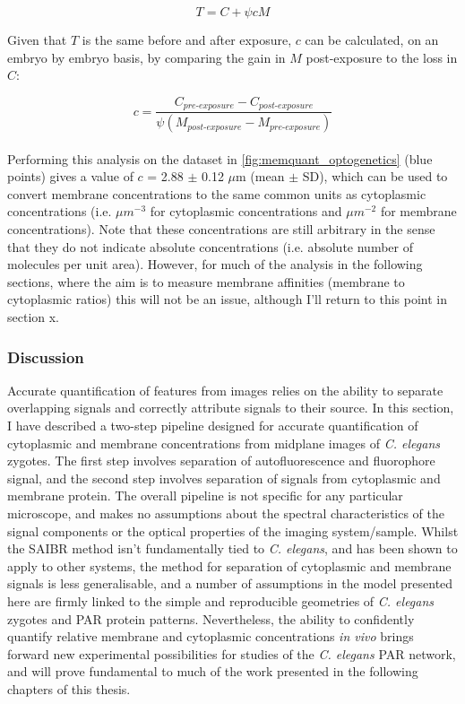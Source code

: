 \documentclass[12pt]{"article"}
\begin{document}
\begin{equation}
T = C + \psi c M
\label{eq:t}
\end{equation}

Given that $T$ is the same before and after exposure, $c$ can be calculated, on an embryo by embryo basis, by comparing the gain in $M$ post-exposure to the loss in $C$:

\begin{equation}
c = \frac{C_{pre \textrm{-} exposure} - C_{post  \textrm{-} exposure}}{\psi (M_{post  \textrm{-} exposure} - M_{pre  \textrm{-} exposure})}
\end{equation}\\

Performing this analysis on the dataset in \cref{fig:memquant_optogenetics} (blue points) gives a value of $c$ = 2.88 $\pm$ 0.12 $\mu$m (mean $\pm$ SD), which can be used to convert membrane concentrations to the same common units as cytoplasmic concentrations (i.e. $\mu m^{-3}$ for cytoplasmic concentrations and $\mu m^{-2}$ for membrane concentrations). Note that these concentrations are still arbitrary in the sense that they do not indicate absolute concentrations (i.e. absolute number of molecules per unit area). However, for much of the analysis in the following sections, where the aim is to measure membrane affinities (membrane to cytoplasmic ratios) this will not be an issue, although I'll return to this point in section x.\\

\clearpage
\subsubsection{Discussion}

Accurate quantification of features from images relies on the ability to separate overlapping signals and correctly attribute signals to their source. In this section, I have described a two-step pipeline designed for accurate quantification of cytoplasmic and membrane concentrations from midplane images of \textit{C. elegans} zygotes. The first step involves separation of autofluorescence and fluorophore signal, and the second step involves separation of signals from cytoplasmic and membrane protein. The overall pipeline is not specific for any particular microscope, and makes no assumptions about the spectral characteristics of the signal components or the optical properties of the imaging system/sample. Whilst the SAIBR method isn't fundamentally tied to \textit{C. elegans}, and has been shown to apply to other systems, the method for separation of cytoplasmic and membrane signals is less generalisable, and a number of assumptions in the model presented here are firmly linked to the simple and reproducible geometries of \textit{C. elegans} zygotes and PAR protein patterns. Nevertheless, the ability to confidently quantify relative membrane and cytoplasmic concentrations \textit{in vivo} brings forward new experimental possibilities for studies of the \textit{C. elegans} PAR network, and will prove fundamental to much of the work presented in the following chapters of this thesis.\\
\end{document}
